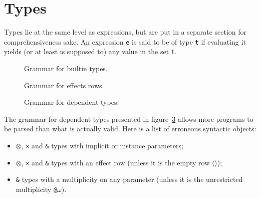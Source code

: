 \section{Types}\label{sec:zilch-grammar-types}

Types lie at the same level as expressions, but are put in a separate section for comprehensiveness sake.
An expression \verb|e| is said to be of type \verb|t| if evaluating it yields (or at least is supposed to) any value in the set \verb|t|.

\begin{figure}[H]
	\centering


	\caption{Grammar for builtin types.}
	\label{fig:zilch-grammar-types-builtin-grammar}
\end{figure}

\begin{figure}[H]
	\centering


	\caption{Grammar for effects rows.}
	\label{fig:zilch-grammar-types-effectrow-grammar}
\end{figure}

\begin{figure}[H]
	\centering


	\caption{Grammar for dependent types.}
	\label{fig:zilch-grammar-types-dependent-grammar}
\end{figure}

\begin{warningbox}
	The grammar for dependent types presented in figure~\ref{fig:zilch-grammar-types-dependent-grammar} allows more programs to be parsed than what is actually valid.
	Here is a list of erroneous syntactic objects:
	\begin{itemize}
		\item \texttt{$\otimes$}, \texttt{×} and \texttt{\&} types with implicit or instance parameters;
		\item \texttt{$\otimes$}, \texttt{×} and \texttt{\&} types with an effect row (unless it is the empty row \texttt{$\langle\rangle$});
		\item \texttt{\&} types with a multiplicity on any parameter (unless it is the unrestricted multiplicity \texttt{@$\omega$}).
	\end{itemize}
\end{warningbox}

